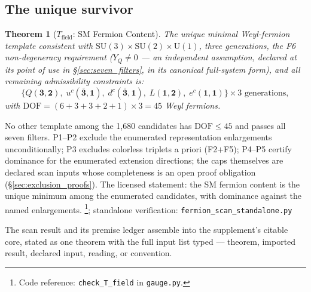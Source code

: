 \documentclass[11pt]{article}
\newtheorem{theorem}{Theorem}[section]
\theoremstyle{definition}
\newcommand{\SU}{\mathrm{SU}}
\newcommand{\U}{\mathrm{U}}
\newcommand{\coderef}[2]{\footnote{Code reference: \texttt{#1} in \texttt{#2}.}}
\begin{document}
\subsection{The unique survivor}
\label{sec:unique_survivor}

\begin{theorem}[$T_{\mathrm{field}}$: SM Fermion Content]\label{thm:Tfield}
The unique minimal Weyl-fermion template consistent with
$\SU(3) \times \SU(2) \times \U(1)$, three generations,
the F6 non-degeneracy requirement ($Y_Q \neq 0$ --- an independent
assumption, declared at its point of use in
\S\ref{sec:seven_filters}, in its canonical full-system form), and all
remaining admissibility constraints is:
\[
  \{Q(\mathbf{3},\mathbf{2}),\;
    u^c(\bar{\mathbf{3}},\mathbf{1}),\;
    d^c(\bar{\mathbf{3}},\mathbf{1}),\;
    L(\mathbf{1},\mathbf{2}),\;
    e^c(\mathbf{1},\mathbf{1})\}
  \times 3 \text{ generations},
\]
with $\mathrm{DOF} = (6+3+3+2+1) \times 3 = 45$ Weyl fermions.
\end{theorem}

\noindent No other template among the 1{,}680 candidates has
$\mathrm{DOF} \le 45$ and passes all seven filters.  P1--P2 exclude
the enumerated representation enlargements unconditionally; P3
excludes colorless triplets a priori (F2$+$F5); P4--P5 certify
dominance for the enumerated extension directions; the caps
themselves are declared scan inputs whose completeness is an open
proof obligation (\S\ref{sec:exclusion_proofs}).  The licensed
statement: the SM fermion content is the unique minimum among the
enumerated candidates, with dominance against the named enlargements.
\coderef{check\_T\_field}{gauge.py}; standalone verification: \texttt{fermion\_scan\_standalone.py}~\cite{BrookeFermionScan}

The scan result and its premise ledger assemble into the
supplement's citable core, stated as one theorem with the full input
list typed --- theorem, imported result, declared input, reading, or
convention.
\end{document}
